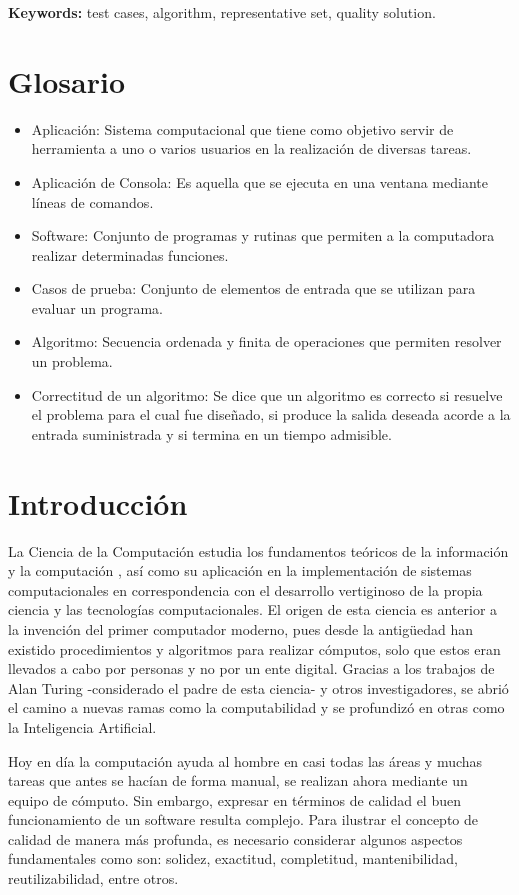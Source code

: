 \documentclass[a4paper,openright,11pt,oneside]{book}
\begin{document}
	\textbf{Keywords:} test cases, algorithm, representative set, quality solution.

\chapter*{Glosario}
	\begin{itemize}
		\item Aplicación: Sistema computacional que tiene como objetivo servir de herramienta a uno o varios usuarios en la realización de diversas tareas.
		\item Aplicación de Consola: Es aquella que se ejecuta en una ventana mediante líneas de comandos.
		\item Software: Conjunto de programas y rutinas que permiten a la computadora realizar determinadas funciones.
		\item Casos de prueba: Conjunto de elementos de entrada que se utilizan para evaluar un programa.
		\item Algoritmo: Secuencia ordenada y finita de operaciones que permiten resolver un problema.
		\item Correctitud de un algoritmo: Se dice que un algoritmo es correcto si resuelve el problema para el cual fue diseñado, si produce la salida deseada acorde a la entrada suministrada y si termina en un tiempo admisible.
	\end{itemize}
	
\chapter{Introducción}

	La Ciencia de la Computación estudia los fundamentos teóricos de la información y la computación \cite{montero2017computacion}, así como su aplicación en la implementación de sistemas computacionales en correspondencia con el desarrollo vertiginoso de la propia ciencia y las tecnologías computacionales. El origen de esta ciencia es anterior a la invención del primer computador moderno, pues desde la antigüedad han existido procedimientos y algoritmos para realizar cómputos, solo que estos eran llevados a cabo por personas y no por un ente digital. Gracias a los trabajos de Alan Turing \cite{Turing} -considerado el padre de esta ciencia- y otros investigadores, se abrió el camino a nuevas ramas como la computabilidad y se profundizó en otras como la Inteligencia Artificial.
	
	Hoy en día la computación ayuda al hombre en casi todas las áreas y muchas tareas que antes se hacían de forma manual, se realizan ahora mediante un equipo de cómputo. Sin embargo, expresar en términos de calidad el buen funcionamiento de un software \cite{lopez2016definicion} resulta complejo. Para ilustrar el concepto de calidad de manera más profunda, es necesario considerar algunos aspectos fundamentales como son: solidez, exactitud, completitud, mantenibilidad, reutilizabilidad, entre otros.
	
\end{document}
